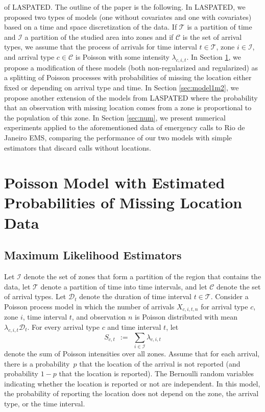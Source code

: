 of LASPATED.
The outline of the paper is the following.
In LASPATED, we proposed two types of models
(one without covariates and one with covariates)
based on a time and space discretization of the
data. If $\mathcal{T}$ is a partition of time
and $\mathcal{I}$ a partition of the studied
area into zones and if $\mathcal{C}$
is the set of arrival types, we assume that
the process of arrivals for time interval
$t \in \mathcal{T}$, zone $i \in \mathcal{I}$,
and arrival type $c \in \mathcal{C}$ is Poisson
with some intensity $\lambda_{c,i,t}$.
In Section \ref{sec:model1}, we propose
a modification of these models
(both non-regularized and regularized) as a splitting of Poisson processes with probabilities of missing the location either fixed or depending on arrival type and time.
In Section \ref{sec:model1m2}, we propose
another extension of the models from LASPATED
where the probability that an observation with missing location comes from a zone is proportional to the population of this zone.
In Section \ref{sec:num}, we present numerical
experiments applied to the aforementioned
data of emergency calls to Rio de Janeiro EMS,
comparing the performance
of our two models with simple estimators that
discard calls without locations. 
\fi


\section{Poisson Model with Estimated Probabilities of Missing Location Data}
\label{sec:model1}

\subsection{Maximum Likelihood Estimators}
\label{sec:model1ml}

Let $\mathcal{I}$ denote the set of zones that form a partition of the region that contains the data, let $\mathcal{T}$ denote a partition of time into time intervals, and let $\mathcal{C}$ denote the set of arrival types.
Let $\mathcal{D}_{t}$ denote the duration of time interval $t \in \mathcal{T}$.
Consider a Poisson process model in which the number of arrivals $X_{c,i,t,n}$ for arrival type $c$, zone $i$, time interval $t$, and observation $n$ is Poisson distributed with mean 
$\lambda_{c,i,t} \mathcal{D}_{t}$.
For every arrival type $c$ and time interval $t$, let
\begin{equation}
\label{sct}
S_{c,t} \ \ := \ \ \sum_{i \in \mathcal{I}} \lambda_{c,i,t}
\end{equation}
denote the sum of Poisson intensities over all zones.
Assume that for each arrival, there is a probability~$p$ that the location of the arrival is not reported (and probability $1-p$ that the location is reported).
The Bernoulli random variables indicating whether the location is reported or not are independent.
In this model, the probability of reporting the location does not depend on the zone, the arrival type, or the time interval.

